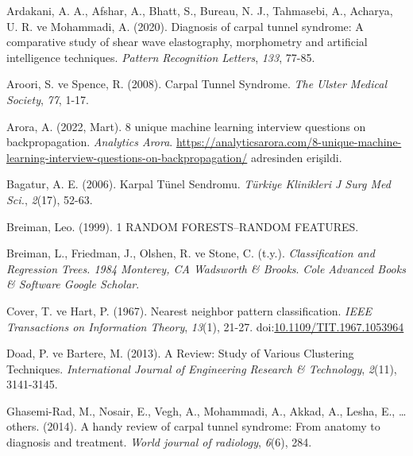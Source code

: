 \documentclass[12pt,twoside]{deuthesis}
\begin{document}
\hypertarget{refs}{}
\begin{CSLReferences}
\leavevmode{}%
Ardakani, A. A., Afshar, A., Bhatt, S., Bureau, N. J., Tahmasebi, A., Acharya, U. R. ve Mohammadi, A. (2020). Diagnosis of carpal tunnel syndrome: A comparative study of shear wave elastography, morphometry and artificial intelligence techniques. \emph{Pattern Recognition Letters}, \emph{133}, 77-85.

\leavevmode{}%
Aroori, S. ve Spence, R. (2008). Carpal Tunnel Syndrome. \emph{The Ulster Medical Society}, \emph{77}, 1-17.

\leavevmode{}%
Arora, A. (2022, Mart). 8 unique machine learning interview questions on backpropagation. \emph{Analytics Arora}. \url{https://analyticsarora.com/8-unique-machine-learning-interview-questions-on-backpropagation/} adresinden erişildi.

\leavevmode{}%
Bagatur, A. E. (2006). Karpal Tünel Sendromu. \emph{Türkiye Klinikleri J Surg Med Sci.}, \emph{2}(17), 52-63.

\leavevmode{}%
Breiman, Leo. (1999). 1 RANDOM FORESTS--RANDOM FEATURES.

\leavevmode{}%
Breiman, L., Friedman, J., Olshen, R. ve Stone, C. (t.y.). \emph{Classification and Regression Trees. 1984 Monterey, CA Wadsworth \& Brooks}. \emph{Cole Advanced Books \& Software Google Scholar}.

\leavevmode{}%
Cover, T. ve Hart, P. (1967). Nearest neighbor pattern classification. \emph{IEEE Transactions on Information Theory}, \emph{13}(1), 21-27. doi:\href{https://doi.org/10.1109/TIT.1967.1053964}{10.1109/TIT.1967.1053964}

\leavevmode{}%
Doad, P. ve Bartere, M. (2013). A Review: Study of Various Clustering Techniques. \emph{International Journal of Engineering Research \& Technology}, \emph{2}(11), 3141-3145.

\leavevmode{}%
Ghasemi-Rad, M., Nosair, E., Vegh, A., Mohammadi, A., Akkad, A., Lesha, E., \ldots{} others. (2014). A handy review of carpal tunnel syndrome: From anatomy to diagnosis and treatment. \emph{World journal of radiology}, \emph{6}(6), 284.


\end{CSLReferences}
\end{document}
